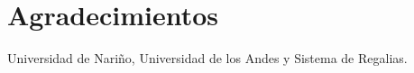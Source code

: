 \documentclass[conference]{IEEEtran}
\begin{document}
  \section*{Agradecimientos}
\fi

Universidad de Nariño, Universidad de los Andes y Sistema de Regalias.

\ifCLASSOPTIONcaptionsoff
  \newpage
\fi





\end{document}

